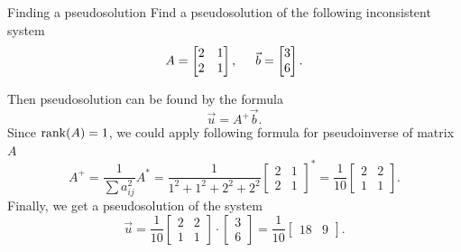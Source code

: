     \begin{problem}{Finding a pseudosolution}
        Find a pseudosolution of the following inconsistent system
        \[
            A = \begin{bmatrix}
                2 & 1\\
                2 & 1
            \end{bmatrix}, \hspace*{0.5cm} \vec{b} = \begin{bmatrix}
                3 \\ 6
            \end{bmatrix}.  
        \]
        \begin{solution}
            Then pseudosolution can be found by the formula
            \[
                \vec{u} = A^+\vec{b}.  
            \]
            Since $\operatorname{rank}(A)=1$, we could apply following formula for pseudoinverse of matrix $A$ 
            \[
                A^+ = \dfrac{1}{\sum{a_{ij}^2}} A^* 
                = \dfrac{1}{1^2+1^2+2^2+2^2} 
                \begin{bmatrix}
                    2 & 1 \\
                    2 & 1
                \end{bmatrix}^* 
                = \dfrac{1}{10} 
                \begin{bmatrix}
                    2 & 2 \\
                    1 & 1
                \end{bmatrix}.
            \]
            Finally, we get a pseudosolution of the system
            \[
                \vec{u} = \dfrac{1}{10} \begin{bmatrix}
                    2 & 2 \\
                    1 & 1
                \end{bmatrix} \cdot \begin{bmatrix}
                    3 \\ 
                    6
                \end{bmatrix} = \dfrac{1}{10} \begin{bmatrix}
                    18 & 9
                \end{bmatrix}.
            \]
        \end{solution}
    \end{problem}
    
